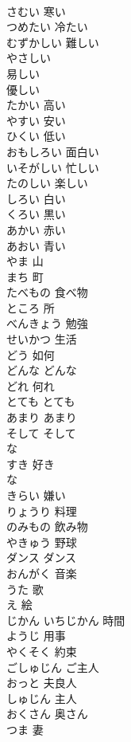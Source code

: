 \documentclass[8pt]{extreport}
\begin{document}
\begin{CJK}{UTF8}{min}
\\	さむい	寒い
\\	つめたい	冷たい
\\	むずかしい	難しい
\\	やさしい	
\\	易しい 
\\	優しい
\\	たかい	高い
\\	やすい	安い
\\	ひくい	低い
\\	おもしろい	面白い
\\	いそがしい	忙しい
\\	たのしい	楽しい
\\	しろい	白い
\\	くろい	黒い
\\	あかい	赤い
\\	あおい	青い
\\	やま	山
\\	まち	町
\\	たべもの	食べ物
\\	ところ	所
\\	べんきょう	勉強
\\	せいかつ	生活
\\	どう	如何
\\	どんな	どんな 
\\	どれ	何れ
\\	とても	とても
\\	あまり	あまり
\\	そして	そして
\\	な 
\\	すき	好き
\\	な 
\\	きらい	嫌い
\\	りょうり	料理
\\	のみもの	飲み物
\\	やきゅう	野球
\\	ダンス	ダンス
\\	おんがく	音楽
\\	うた	歌
\\	え	絵
\\	じかん いちじかん	時間
\\	ようじ	用事
\\	やくそく	約束
\\	ごしゅじん	ご主人
\\	おっと	夫良人
\\	しゅじん	主人
\\	おくさん	奥さん
\\	つま	妻

\end{CJK}
\end{document}
